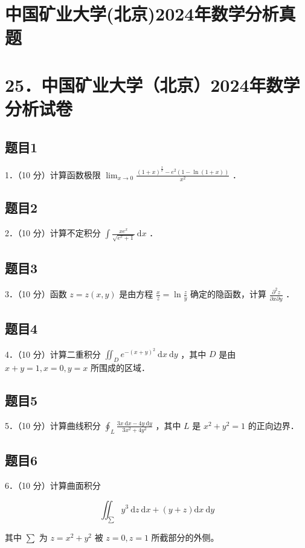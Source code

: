 \documentclass{article}
\begin{document}
\section*{中国矿业大学(北京)2024年数学分析真题}
\section*{25．中国矿业大学（北京）2024年数学分析试卷}

\subsection{题目1}
1．（10 分）计算函数极限 \(\lim _{x \rightarrow 0} \frac{(1+x)^{\frac{2}{x}}-e^{2}(1-\ln (1+x))}{x^{2}}\) ．

\subsection{题目2}
2．（10 分）计算不定积分 \(\int \frac{x e^{x}}{\sqrt{e^{x}+1}} \mathrm{~d} x\) ．

\subsection{题目3}
3．（10 分）函数 \(z=z(x, y)\) 是由方程 \(\frac{x}{z}=\ln \frac{z}{y}\) 确定的隐函数，计算 \(\frac{\partial^{2} z}{\partial x \partial y}\) ．

\subsection{题目4}
4．（10 分）计算二重积分 \(\iint_{D} e^{-(x+y)^{2}} \mathrm{~d} x \mathrm{~d} y\) ，其中 \(D\) 是由 \(x+y=1, x=0, y=x\) 所围成的区域．

\subsection{题目5}
5．（10 分）计算曲线积分 \(\oint_{L} \frac{3 x \mathrm{~d} x-4 y \mathrm{~d} y}{3 x^{2}+4 y^{2}}\) ，其中 \(L\) 是 \(x^{2}+y^{2}=1\) 的正向边界．

\subsection{题目6}
6．（10 分）计算曲面积分

\[
\iint_{\sum} y^{3} \mathrm{~d} z \mathrm{~d} x+(y+z) \mathrm{d} x \mathrm{~d} y
\]

其中 \(\sum\) 为 \(z=x^{2}+y^{2}\) 被 \(z=0, z=1\) 所截部分的外侧。
\end{document}
